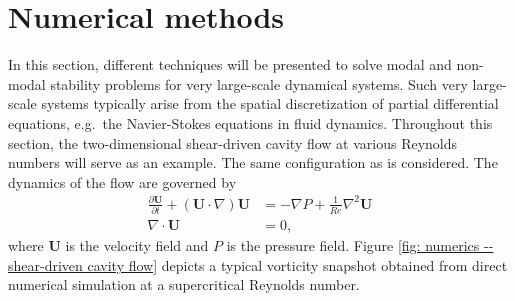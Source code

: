 \section{Numerical methods}
\label{sec: numerics}

In this section, different techniques will be presented to solve modal and non-modal stability problems for very large-scale dynamical systems. Such very large-scale systems typically arise from the spatial discretization of partial differential equations, e.g.\ the Navier-Stokes equations in fluid dynamics. Throughout this section, the two-dimensional shear-driven cavity flow at various Reynolds numbers will serve as an example. The same configuration as \cite{??} is considered. The dynamics of the flow are governed by
\begin{equation}
  \begin{aligned}
    \displaystyle \frac{\partial \mathbf{U}}{\partial t} + \left( \mathbf{U} \cdot \nabla \right) \mathbf{U} & = - \nabla P + \frac{1}{Re} \nabla^2 \mathbf{U} \\
    \nabla \cdot \mathbf{U} & = 0,
  \end{aligned}
  \label{eq: numerics -- Navier-Stokes equations}
\end{equation}
where $\mathbf{U}$ is the velocity field and $P$ is the pressure field. Figure \ref{fig: numerics -- shear-driven cavity flow} depicts a typical vorticity snapshot obtained from direct numerical simulation at a supercritical Reynolds number.

